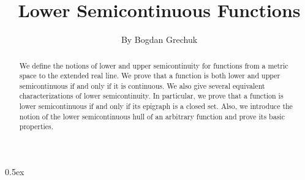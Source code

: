 \documentclass[11pt,a4paper]{article}
\begin{document}
\title{Lower Semicontinuous Functions}
\author{By Bogdan Grechuk}
\maketitle

\begin{abstract}
  We define the notions of lower and upper semicontinuity for functions from a
  metric space to the extended real line. We prove that a function is both lower
  and upper semicontinuous if and only if it is continuous. We also give several
  equivalent characterizations of lower semicontinuity. In particular, we prove
  that a function is lower semicontinuous if and only if its epigraph is a
  closed set. Also, we introduce the notion of the lower semicontinuous hull of
  an arbitrary function and prove its basic properties.
\end{abstract}

\tableofcontents

\parindent 0pt\parskip 0.5ex

\end{document}
